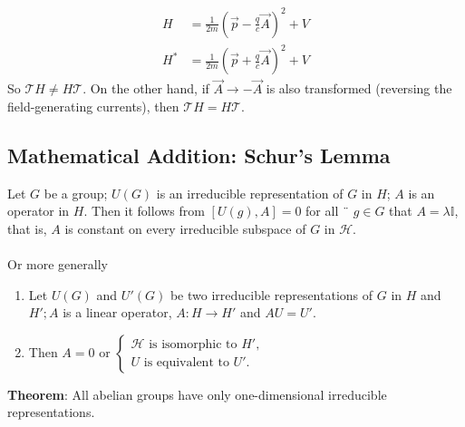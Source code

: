\begin{equation}
\begin{aligned} H &=\frac{1}{2 m}\left(\vec{p}-\frac{q}{c} \vec{A}\right)^{2}+V \\ H^{*} &=\frac{1}{2 m}\left(\vec{p}+\frac{q}{c} \vec{A}\right)^{2}+V \end{aligned}
\end{equation}
So $\mathcal{T}H\neq H\mathcal{T}$. On the other hand, if $\vec{A}\rightarrow -\vec{A}$ is also transformed (reversing the field-generating currents), then $\mathcal{T}H= H\mathcal{T}$.

\subsection{Mathematical Addition: Schur's Lemma}
Let $G$ be a group; $U (G)$ is an irreducible representation of $G$ in $H$; $A$ is an operator in $H$. Then it follows from $[U (g), A] = 0$ for all ¨ $g \in G$ that $A = \lambda\mathbb{I}$, that is, $A$ is constant on every irreducible subspace of $G$ in $\mathcal{H}$.\\\\
Or more generally
\begin{enumerate}
    \item[] Let $U (G)$ and $U' (G)$ be two irreducible representations of $G$ in $H$ and $H'; A$ is a linear operator, $A: H \rightarrow H'$ and $AU = U'$.
    \item[] Then $A = 0$ or $\left\{\begin{array}{c}{\mathcal
        H \text{ is isomorphic to } H'},\\U \text{ is equivalent to } U'.     
    \end{array} \right.$  
\end{enumerate}
\textbf{Theorem}: All abelian groups have only one-dimensional irreducible representations.